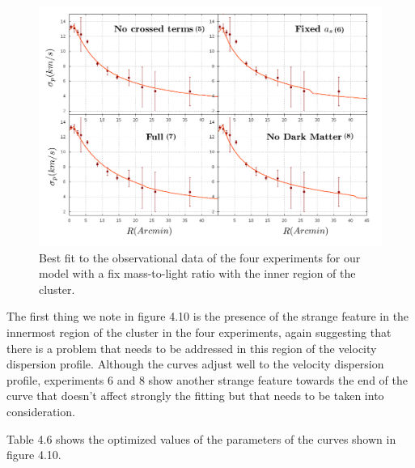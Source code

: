 \begin{figure}[]
\centering
\includegraphics[width=15cm]{images/fix_gamma_refinado_12.png}
\caption[Best fit of our model with a fix mass-to-light ratio with the inner region]{Best fit to the observational data of the four experiments for our model with a fix mass-to-light ratio with the inner region of the cluster.}
\end{figure}

The first thing we note in figure 4.10 is the presence of the strange feature in the innermost region of the cluster in the four experiments, again suggesting that there is a problem that needs to be addressed in this region of the velocity dispersion profile. Although the curves adjust well to the velocity dispersion profile, experiments 6 and 8 show another strange feature towards the end of the curve that doesn't affect strongly the fitting but that needs to be taken into consideration.

Table 4.6 shows the optimized values of the parameters of the curves shown in figure 4.10.


